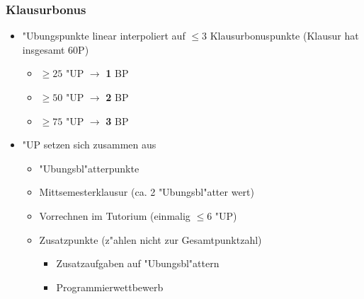 \begin{frame}
  \frametitle{Klausurbonus}
  \begin{itemize}
    \item "Ubungspunkte linear interpoliert auf $\leq 3$ Klausurbonuspunkte
          (Klausur hat insgesamt 60P)
      \begin{itemize}
      \item $\geq 25$ "UP $\rightarrow$ \textbf{1} BP
      \item $\geq 50$ "UP $\rightarrow$ \textbf{2} BP
      \item $\geq 75$ "UP $\rightarrow$ \textbf{3} BP
      \end{itemize}
    \item "UP setzen sich zusammen aus
      \begin{itemize}
      \item "Ubungsbl"atterpunkte
      \item Mittsemesterklausur (ca. 2 "Ubungsbl"atter wert)
      \item Vorrechnen im Tutorium (einmalig $\leq 6$ "UP)
      \item Zusatzpunkte (z"ahlen nicht zur Gesamtpunktzahl)
        \begin{itemize}
        \item Zusatzaufgaben auf "Ubungsbl"attern
        \item Programmierwettbewerb
        \end{itemize}
      \end{itemize}
  \end{itemize}
\end{frame}

